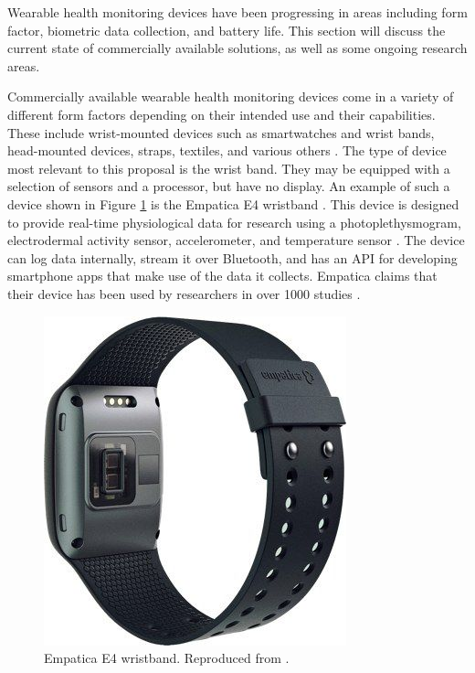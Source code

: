Wearable health monitoring devices have been progressing in areas including
form factor, biometric data collection, and battery life.  This section will
discuss the current state of commercially available solutions, as well as some
ongoing research areas.

Commercially available wearable health monitoring devices come in a variety of
different form factors depending on their intended use and their capabilities.
These include wrist-mounted devices such as smartwatches and wrist bands,
head-mounted devices, straps, textiles, and various
others \cite{Seneviratne2017}.  The type of device most relevant to this
proposal is the wrist band.  They may be equipped with a selection of sensors
and a processor, but have no display.  An example of such a device shown in 
Figure \ref{fig:EmpaticaE4} is the Empatica E4 wristband \cite{McCarthy2016}.  
This device is designed to provide real-time
physiological data for research using a photoplethysmogram, electrodermal
activity sensor, accelerometer, and temperature sensor \cite{empatica}. The
device can log data internally, stream it over Bluetooth, and has an API for
developing smartphone apps that make use of the data it collects. Empatica
claims that their device has been used by researchers in over 1000 studies
\cite{empatica}.

\begin{figure}[!htb]
\centering
\includegraphics[scale = 0.5]{images/EmpaticaE4.jpg}
\caption{Empatica E4 wristband. Reproduced from \cite{empatica}.}
\label{fig:EmpaticaE4}
\end{figure}

